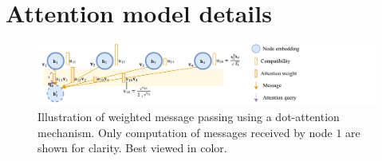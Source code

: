 \section{Attention model details}
\label{sec:appendix_attention_model_details}

\begin{figure}[ht]
\vskip 0.2in
\begin{center}
\centerline{\includegraphics[trim={0 0 176 0},clip,width=\columnwidth]{./images/Attention}}
\caption{Illustration of weighted message passing using a dot-attention mechanism. Only computation of messages received by node $1$ are shown for clarity. Best viewed in color.}
\label{fig:attention_mechanism}
\end{center}
\vskip -0.2in
\end{figure}

